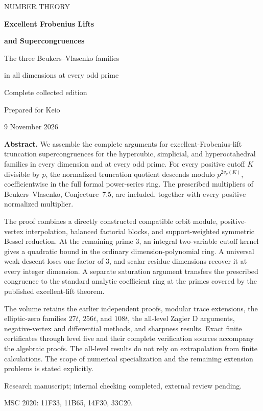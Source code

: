 \documentclass[11pt,a4paper]{article}
\theoremstyle{definition}\newtheorem{definition}[theorem]{Definition}
\theoremstyle{remark}\newtheorem{remark}[theorem]{Remark}
\numberwithin{equation}{section}
\begin{document}
\hypersetup{pageanchor=false}
\begin{titlepage}
\centering
\vspace*{12mm}
{\large NUMBER THEORY\par}
\vspace{11mm}
{\LARGE\bfseries Excellent Frobenius Lifts\par}
\vspace{2mm}
{\LARGE\bfseries and Supercongruences\par}
\vspace{7mm}
{\large The three Beukers--Vlasenko families\par}
{\large in all dimensions at every odd prime\par}
\vspace{9mm}
{\large Complete collected edition\par}
\vspace{2mm}
{Prepared for Keio\par}
{9 November 2026\par}
\vspace{8mm}
\begin{minipage}{0.89\textwidth}\small
\textbf{Abstract.}
We assemble the complete arguments for excellent-Frobenius-lift
truncation supercongruences for the hypercubic, simplicial, and
hyperoctahedral families in every dimension and at every odd prime.
For every positive cutoff $K$ divisible by $p$, the normalized
truncation quotient descends modulo $p^{2v_p(K)}$, coefficientwise
in the full formal power-series ring. The prescribed multipliers of
Beukers--Vlasenko, Conjecture~7.5, are included, together with every
positive normalized multiplier.

The proof combines a directly constructed compatible orbit module,
positive-vertex interpolation, balanced factorial blocks, and
support-weighted symmetric Bessel reduction. At the remaining prime
$3$, an integral two-variable cutoff kernel gives a quadratic bound
in the ordinary dimension-polynomial ring. A universal weak descent
loses one factor of $3$, and scalar residue dimensions recover it
at every integer dimension. A separate saturation argument transfers
the prescribed congruence to the standard analytic coefficient ring
at the primes covered by the published excellent-lift theorem.

The volume retains the earlier independent proofs, modular trace
extensions, the elliptic-zero families $27t$, $256t$, and $108t$,
the all-level Zagier D arguments, negative-vertex and differential
methods, and sharpness results. Exact finite certificates through
level five and their complete verification sources accompany the
algebraic proofs. The all-level results do not rely on extrapolation
from finite calculations. The scope of numerical specialization and
the remaining extension problems is stated explicitly.
\end{minipage}
\vfill
{\small Research manuscript; internal checking completed, external review pending.\par}
{\small MSC 2020: 11F33, 11B65, 14F30, 33C20.\par}
\end{titlepage}
\hypersetup{pageanchor=true}
\tableofcontents
\clearpage
{}
\end{document}
